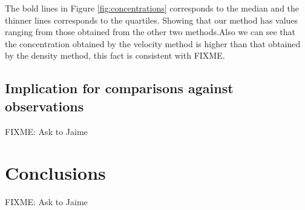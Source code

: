 \documentclass[useAMS,usenatbib]{mn2e}
\begin{document}
The bold lines in Figure \ref{fig:concentrations} corresponds to the median and the thinner lines corresponds to the quartiles. Showing that our method has values ​​ranging from those obtained from the other two methods.Also we can see that the concentration obtained by the velocity method is higher than that obtained by the density method, this fact is consistent with FIXME.
\subsection{Implication for comparisons against observations}
FIXME: Ask to Jaime

\section{Conclusions}
\label{sec:conclusions}
FIXME: Ask to Jaime



\end{document}
